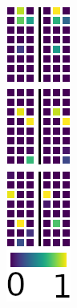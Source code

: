\begin{figure}
\begin{subfigure}[c]{.09\linewidth}
        \caption{}
    \end{subfigure}
        \hfill
    \begin{subfigure}[c]{.059\linewidth}
        \includegraphics[width=\linewidth]{figures/SCA/mnist/acts}

\end{subfigure}
\end{figure}
